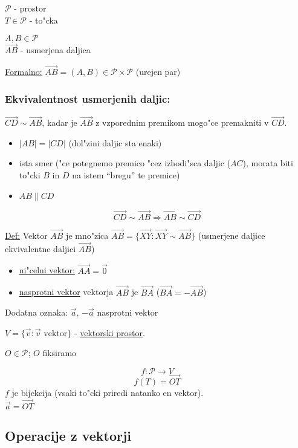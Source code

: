 \(\mathcal{P}\) - prostor\\
\(T \in \mathcal{P}\) - to"cka

\(A, B \in \mathcal{P}\)\\
\(\overrightarrow{AB}\) - usmerjena daljica

\underline{Formalno:} \(\overrightarrow{AB} = (A, B) \in \mathcal{P} \times \mathcal{P}\) (urejen par)

\subsubsection*{Ekvivalentnost usmerjenih daljic:}

\(\overrightarrow{CD} \sim \overrightarrow{AB}\), kadar je \(\overrightarrow{AB}\) z vzporednim premikom mogo"ce premakniti v \(\overrightarrow{CD}\).
\begin{itemize}
	\item \(|AB| = |CD|\) (dol"zini daljic sta enaki)
	\item ista smer ("ce potegnemo premico "cez izhodi"sca daljic (\(AC\)), morata biti to"cki \(B\) in \(D\) na istem ``bregu'' te premice)
	\item \(AB \parallel CD\)
\end{itemize}
\[\overrightarrow{CD} \sim \overrightarrow{AB} \Rightarrow \overrightarrow{AB} \sim \overrightarrow{CD}\]

\underline{Def:} Vektor \(\vec{AB}\) je mno"zica \(\vec{AB} = \{\overrightarrow{XY}: \overrightarrow{XY} \sim \overrightarrow{AB}\}\) (usmerjene daljice ekvivalentne daljici \(\overrightarrow{AB}\))

\begin{itemize}
	\item \underline{ni"celni vektor:} \(\vec{AA} = \vec{0}\)
	\item \underline{nasprotni vektor} vektorja \(\vec{AB}\) je \(\vec{BA}\) (\(\vec{BA} = -\vec{AB}\))
\end{itemize}

Dodatna oznaka: \(\vec{a}\), \(-\vec{a}\) nasprotni vektor

\(V = \{\vec{v}: \vec{v} \text{ vektor} \}\) - \underline{vektorski prostor}.

\(O \in \mathcal{P}\); \(O\) fiksiramo

\[f: \mathcal{P} \rightarrow V\]
\[f(T) = \vec{OT}\]
\(f\) je bijekcija (vsaki to"cki priredi natanko en vektor).\\
\(\vec{a} = \vec{OT}\)

\subsection{Operacije z vektorji}
